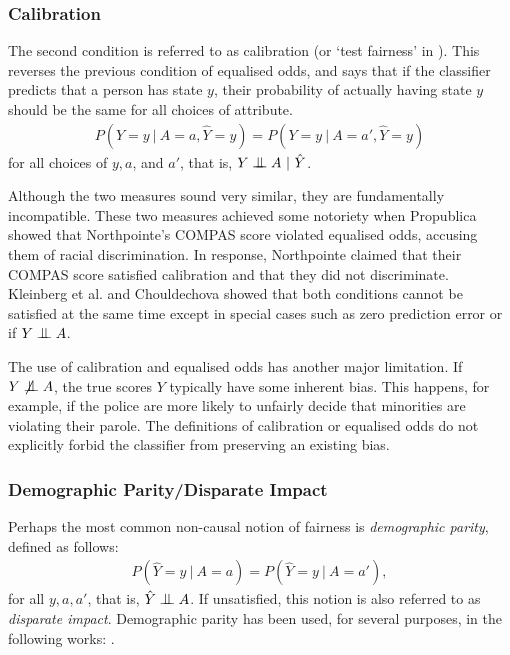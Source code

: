 \documentclass{article}
\newcommand{\cind}[0]{\mathrel{\text{\scalebox{1.07}{$\perp\mkern-10mu\perp$}}}}
\newcommand{\ncind}[0]{\mathrel{\text{\scalebox{1.07}{$\not\perp\mkern-10mu\perp$}}}}
\begin{document}
\subsubsection{Calibration}
The second condition is referred to as calibration (or `test fairness' in
\cite{chouldechova2017fair}). This reverses the previous condition of equalised
odds, and says that if the classifier predicts that a person has state $y$,
their probability of actually having state $y$ should be the same for all
choices of attribute.
\begin{align}
P(Y = y\ |\ A = a, \hat{Y} = y) = P(Y = y\ |\ A = a', \hat{Y} = y) \label{eq:ca}
\end{align}
for all choices of $y,a$, and $a'$, that is, $Y \cind A \ |\ \hat{Y}$.

Although the two measures sound very similar, they are fundamentally
incompatible. These two measures achieved some notoriety when Propublica showed
that Northpointe's COMPAS score violated equalised odds, accusing them of
racial discrimination. In response, Northpointe claimed that their COMPAS
score satisfied calibration and that they did not discriminate. Kleinberg et al.
\citep{kleinberg2016inherent} and Chouldechova \citep{chouldechova:17}
showed that both conditions cannot be
satisfied at the same time except in special cases such as zero prediction error
or if $Y \cind A$.%
     
The use of calibration and equalised odds has another major
limitation. If $Y \ncind A$, the true scores $Y$ typically have some inherent bias. This happens, for example, if the 
police are more likely to unfairly decide that minorities are violating
their parole. The definitions of calibration or equalised odds do not explicitly forbid the classifier from preserving an existing bias. 

\subsubsection{Demographic Parity/Disparate Impact}
Perhaps the most common  non-causal notion of fairness is \emph{demographic parity}, defined as follows:
\begin{align}
P(\hat{Y} = y\ |\ A = a) = P(\hat{Y} = y\ |\ A = a'), \label{eq:dp}
\end{align}
for all $y,a,a'$, that is, $\hat Y \cind A$. If unsatisfied, this notion is also referred to as \emph{disparate impact}. Demographic parity has been used, for several purposes, in the following works:
\cite{kamiran2009classifying, kamishima2012fairness, zemel2013learning,
  louizos2015variational, edwards2015censoring, zafar2017fairness}.
\end{document}
